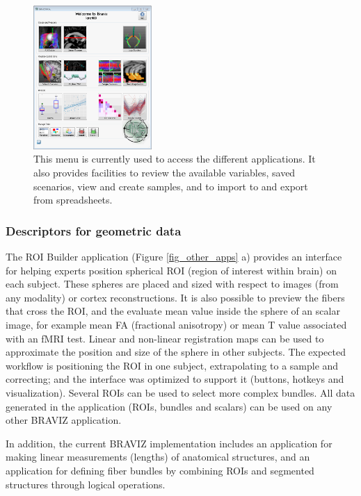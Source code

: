 \documentclass[twocolumn]{svjour3} %
\begin{document}
\begin{figure}
\begin{center}
\includegraphics[width=0.4\textwidth]{figures/braviz_menu.PNG}
\end{center}
 \caption{\label{fig_menu}This menu is currently used to access the different applications. It also provides facilities to review the available variables, saved scenarios, view and create samples, and to import to and export from spreadsheets.  }
\end{figure}


\subsubsection{Descriptors for geometric data}

The ROI Builder application (Figure \ref{fig_other_apps} a) provides an interface for helping experts position spherical ROI  (region of interest within brain) on each subject. These spheres are placed and sized with respect to images (from any modality) or cortex reconstructions. It is also possible to preview the fibers that cross the ROI, and the evaluate mean value inside the sphere of an scalar image, for example mean FA (fractional anisotropy) or mean T value associated with an fMRI test. 
Linear and non-linear registration maps can be used to approximate the position and size of the sphere in other subjects. The expected workflow is positioning the ROI in one subject, extrapolating to a sample and correcting; and the interface was optimized to support it (buttons, hotkeys and visualization). Several ROIs can be used to select more complex bundles. All data generated in the application (ROIs, bundles and scalars) can be used on any other BRAVIZ application. 

In addition, the current BRAVIZ implementation includes an application for making linear measurements (lengths) of anatomical structures, and an application for defining fiber bundles by combining ROIs and segmented structures through logical operations.
\end{document}
